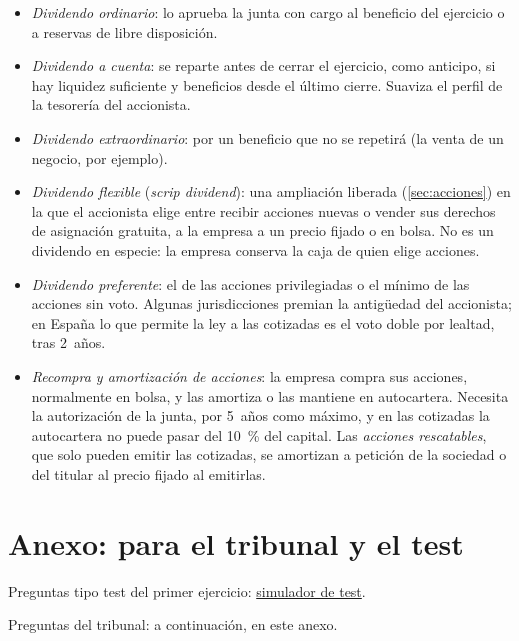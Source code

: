 \documentclass[11pt]{article}
\begin{document}
\begin{itemize}
\item \emph{Dividendo ordinario}: lo aprueba la junta con cargo al beneficio del ejercicio o a reservas de libre disposición.
\item \emph{Dividendo a cuenta}: se reparte antes de cerrar el ejercicio, como anticipo, si hay liquidez suficiente y beneficios desde el último cierre\nocite{LSC2010}. Suaviza el perfil de la tesorería del accionista.
\item \emph{Dividendo extraordinario}: por un beneficio que no se repetirá (la venta de un negocio, por ejemplo).
\item \emph{Dividendo flexible} (\emph{scrip dividend}): una ampliación liberada (\ref{sec:acciones}) en la que el accionista elige entre recibir acciones nuevas o vender sus derechos de asignación gratuita, a la empresa a un precio fijado o en bolsa. No es un dividendo en especie: la empresa conserva la caja de quien elige acciones.
\item \emph{Dividendo preferente}: el de las acciones privilegiadas o el mínimo de las acciones sin voto\nocite{LSC2010}. Algunas jurisdicciones premian la antigüedad del accionista; en España lo que permite la ley a las cotizadas es el voto doble por lealtad, tras 2~años\nocite{LSC2010}.
\item \emph{Recompra y amortización de acciones}: la empresa compra sus acciones, normalmente en bolsa, y las amortiza o las mantiene en autocartera. Necesita la autorización de la junta, por 5~años como máximo\nocite{LSC2010}, y en las cotizadas la autocartera no puede pasar del 10~\% del capital\nocite{LSC2010}. Las \emph{acciones rescatables}, que solo pueden emitir las cotizadas, se amortizan a petición de la sociedad o del titular al precio fijado al emitirlas\nocite{LSC2010}.
\end{itemize}

\section{Anexo: para el tribunal y el test}\label{anexo:test}

\begin{anotaciones}
Preguntas tipo test del primer ejercicio: \href{https://www.victorgutierrezmarcos.es/oposicion/temario/primer-ejercicio/test/simulador.html?tema=3.B.3}{simulador de test}.

Preguntas del tribunal: a continuación, en este anexo.
\end{anotaciones}
\end{document}
